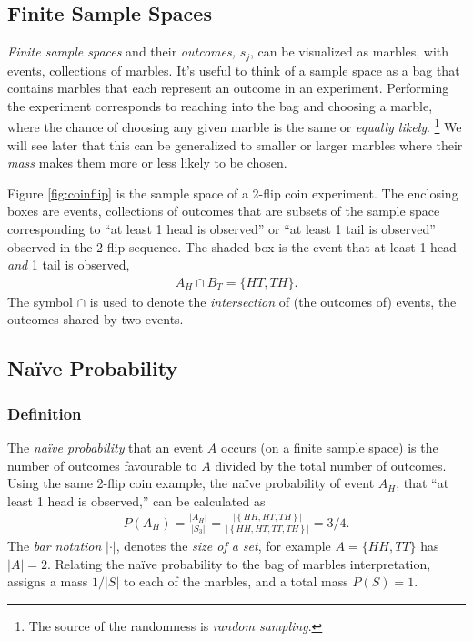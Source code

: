 \documentclass[11pt,a4paper]{article}
\begin{document}
\subsection{Finite Sample Spaces}

\emph{Finite sample spaces} and their \emph{outcomes,} \(s_{j}\), 
can be visualized as marbles, 
with events, 
collections of marbles. 
It's useful to think of a sample space 
as a bag that contains marbles that each represent 
an outcome in an experiment. 
Performing the experiment corresponds to reaching 
into the bag and choosing a marble, 
where the chance of choosing any given marble 
is the same or \emph{equally likely}.%
\footnote{%
The source of the randomness is \emph{random sampling}.} 
We will see later that this can be generalized to smaller 
or larger marbles where their \emph{mass} makes them more or
less likely to be chosen.

Figure \ref{fig:coinflip} is the sample space of a 2-flip coin experiment.
The enclosing boxes are events, 
collections of outcomes that are subsets of the sample 
space corresponding to ``at least 1 head is observed'' or 
``at least 1 tail is observed'' observed in the 2-flip sequence. 
The shaded box is the event that at least 1 head \emph{and} 1 tail is observed,
\begin{align}
A_{H} \cap B_{T} = \{HT, TH\}.
\end{align}
The symbol \(\cap\) is used to denote the \emph{intersection} of (the outcomes of) events,
the outcomes shared by two events.

\subsection{Naïve Probability}

\subsubsection{Definition}

The \emph{naïve probability} that an event \(A\) 
occurs (on a finite sample space) is 
the number of outcomes favourable to \(A\) divided by the total number of outcomes. 
Using the same 2-flip coin example, 
the naïve probability of event \(A_{H}\), 
that ``at least 1 head is observed,''
can be calculated as
\begin{align}
P\left( A_{H} \right) = \frac{\left| A_{H} \right|}{\left| S_{3} \right|} = 
\frac{\left| \left\{ HH, HT,TH \right\} \right|}{|\left\{ HH,HT,TT,TH \right\}|} = 3/4.
\end{align}
The \emph{bar notation} \(|\cdot|\), 
denotes the \emph{size of a set}, 
for example \(A = \{HH, TT\}\) 
has \(|A| = 2\).
Relating the naïve probability to the bag of marbles interpretation,
assigns a mass \(1/|S|\) to each of the marbles, 
and a total mass \(P(S) = 1\).
\end{document}

